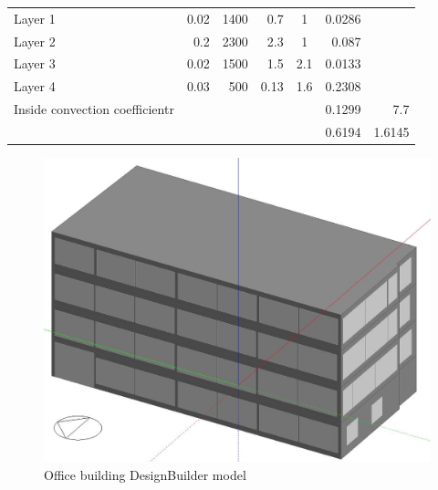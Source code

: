 \documentclass[a4paper, oneside]{discothesis}
\begin{document}
\begin{table}[h!]
\begin{tabular}{rrrrcrr}
			    \multicolumn{1}{l}{Layer 1} & 0.02 & 1400 & 0.7  & 1    & 0.0286 &  \\
			    \multicolumn{1}{l}{Layer 2} & 0.2  & 2300 & 2.3  & 1    & 0.087 &  \\
			    \multicolumn{1}{l}{Layer 3} & 0.02 & 1500 & 1.5  & 2.1  & 0.0133 &  \\
			    \multicolumn{1}{l}{Layer 4} & 0.03 & 500  & 0.13 & 1.6  & 0.2308 &  \\
			    \multicolumn{1}{l}{Inside convection coefficientr} &      &      &      &      & 0.1299 & 7.7 \\
			         &      &      &      &      & 0.6194 & 1.6145 \\
			    \bottomrule
			    \end{tabular}%
			  \label{tab:HonggerWallMat}%
			\end{table}%



			\begin{figure}[H]
			\centering
			\includegraphics[scale=0.4]{SumatraDesignBuilderModel.JPG}
			\caption{Office building DesignBuilder model}
			\label{fig:SumatraDB}
			\end{figure}
\end{document}
